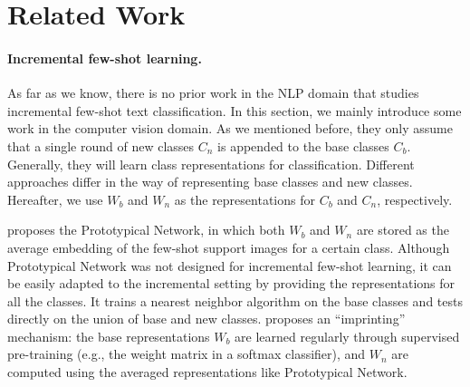 \documentclass[11pt]{article}
\begin{document}
\section{Related Work}
\label{sec:relatedwork}
\paragraph{Incremental few-shot learning.} As far as we know, there is no prior work in the NLP domain that studies incremental few-shot text classification. In this section, we mainly introduce some work in the computer vision domain. As we mentioned before, they only assume that a single round of new classes $C_n$ is appended to the base classes $C_b$. Generally, they will learn class representations for classification.
Different approaches differ in the way of representing base classes and new classes. Hereafter, we use $W_b$ and $W_n$ as the representations for $C_b$ and $C_n$, respectively.


 proposes the Prototypical Network, in which both $W_b$ and $W_n$ are stored as the average embedding of the few-shot support images for a certain class.
Although Prototypical Network was not designed for incremental few-shot learning, it can be easily adapted to the incremental setting by providing the representations for all the classes. It trains a nearest neighbor algorithm on the base classes and tests directly on the union of base and new classes.  proposes an ``imprinting'' mechanism: the base representations $W_b$ are learned regularly through supervised pre-training (e.g., the weight matrix in a softmax classifier), and $W_n$ are computed using the averaged representations like Prototypical Network.

\end{document}
